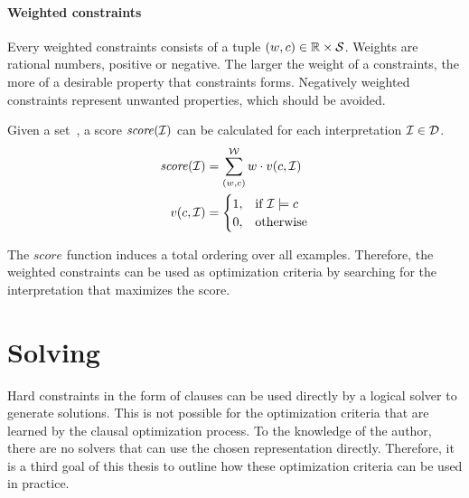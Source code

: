 \paragraph{Weighted constraints}
Every weighted constraints consists of a tuple $(w, c) \in \mathbb{R} \times \mathcal{S}$.
Weights are rational numbers, positive or negative.
The larger the weight of a constraints, the more of a desirable property that constraints forms.
Negatively weighted constraints represent unwanted properties, which should be avoided.

Given a set~, a score $\mathit{score}(\mathcal{I})$ can be calculated for each interpretation $\mathcal{I} \in \mathcal{D}$.
\begin{align*}
	\mathit{score}(\mathcal{I}) &= \sum\limits_{(w, c)}^{\mathcal{W}} w \cdot v(c, \mathcal{I}) \\
	v(c, \mathcal{I}) &=
	\begin{cases}
		1,& \text{if } \mathcal{I} \models c\\
		0,& \text{otherwise}
	\end{cases}
\end{align*}

The $\mathit{score}$ function induces a total ordering over all examples.
Therefore, the weighted constraints  can be used as optimization criteria by searching for the interpretation that maximizes the score.

\section{Solving}
Hard constraints in the form of clauses can be used directly by a logical solver to generate solutions.
This is not possible for the optimization criteria that are learned by the clausal optimization process.
To the knowledge of the author, there are no solvers that can use the chosen representation directly.
Therefore, it is a third goal of this thesis to outline how these optimization criteria can be used in practice.